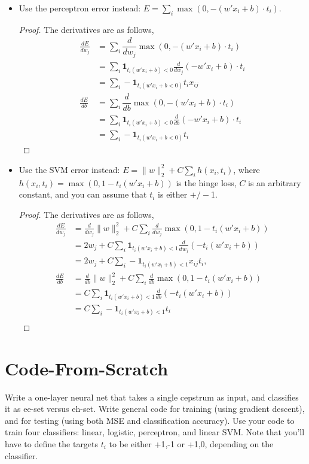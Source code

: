 \documentclass[11pt]{article}
\newcommand{\1}{\mathbf{1}}
\begin{document}
\begin{itemize}
  \item Use the perceptron error instead: $E = \sum_i \max(0, -(w'x_i+b)\cdot t_i)$.
  \begin{proof}
    The derivatives are as follows,
    \begin{align*}
      \frac{dE}{dw_j} &= \sum_i \dfrac{d}{dw_j} \max(0, -(w'x_i+b)\cdot t_i)  \\ 
      &= \sum_i \1_{t_i(w'x_i + b) < 0} \frac{d}{dw_j} (-w'x_i + b)\cdot t_i \\
      &= \sum_i - \1_{t_i (w'x_i + b < 0)} t_ix_{ij} \\
      \frac{dE}{db} &= \sum_i \dfrac{d}{db} \max(0, -(w'x_i+b)\cdot t_i)  \\ 
      &= \sum_i \1_{t_i(w'x_i + b) < 0} \frac{d}{db} (-w'x_i + b)\cdot t_i \\
      &= \sum_i - \1_{t_i (w'x_i + b < 0)} t_i
    \end{align*}
  \end{proof}
  \item Use the SVM error instead: $E = \|w\|_2^2 +C\sum_i h(x_i, t_i)$, where $h(x_i, t_i) = \max(0, 1-t_i(w'x_i+b))$ is the hinge loss, $C$ is an arbitrary constant, and you can assume that $t_i$ is either $+/-$1.
  \begin{proof}
    The derivatives are as follows,
    \begin{align*}
      \frac{dE}{dw_j} &= \frac{d}{dw_j}\|w\|_2^2 + C\sum_i \frac{d}{dw_j} \max(0, 1-t_i(w'x_i + b))\\
      &= 2w_j + C\sum_i \1_{t_i(w'x_i+b) < 1} \frac{d}{dw_j} (-t_i(w'x_i + b)) \\
      &= 2w_j + C\sum_i -\1_{t_i(w'x_i+b) < 1}x_{ij}t_i, \\
      \frac{dE}{db} &= \frac{d}{db}\|w\|_2^2 + C\sum_i \frac{d}{db} \max(0, 1-t_i(w'x_i + b))\\
      &= C\sum_i \1_{t_i(w'x_i+b) < 1} \frac{d}{db} (-t_i(w'x_i + b)) \\
      &= C\sum_i -\1_{t_i(w'x_i+b) < 1}t_i \\
    \end{align*}
  \end{proof} 
\end{itemize}

\section{Code-From-Scratch}
Write a one-layer neural net that takes a single cepstrum as input, and classifies it as ee-set versus eh-set. Write general code for training (using gradient descent), and for testing (using both MSE and classification accuracy). Use your code to train four classifiers: linear, logistic, perceptron, and linear SVM. Note that you'll have to define the targets $t_i$ to be either {+1,-1} or {+1,0}, depending on the classifier.
\end{document}
